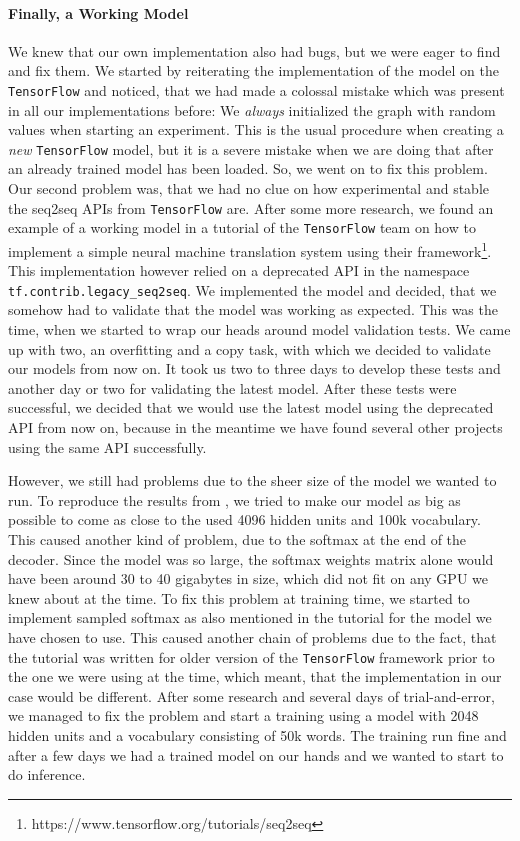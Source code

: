 \paragraph{Finally, a Working Model} We knew that our own implementation also had bugs, but we were eager to find and fix them. We started by reiterating the implementation of the model on the \texttt{TensorFlow} and noticed, that we had made a colossal mistake which was present in all our implementations before: We \emph{always} initialized the graph with random values when starting an experiment. This is the usual procedure when creating a \emph{new} \texttt{TensorFlow} model, but it is a severe mistake when we are doing that after an already trained model has been loaded. So, we went on to fix this problem. Our second problem was, that we had no clue on how experimental and stable the seq2seq APIs from \texttt{TensorFlow} are. After some more research, we found an example of a working model in a tutorial of the \texttt{TensorFlow} team on how to implement a simple neural machine translation system using their framework\footnote{https://www.tensorflow.org/tutorials/seq2seq}. This implementation however relied on a deprecated API in the namespace \texttt{tf.contrib.legacy\_seq2seq}. We implemented the model and decided, that we somehow had to validate that the model was working as expected. This was the time, when we started to wrap our heads around model validation tests. We came up with two, an overfitting and a copy task, with which we decided to validate our models from now on. It took us two to three days to develop these tests and another day or two for validating the latest model. After these tests were successful, we decided that we would use the latest model using the deprecated API from now on, because in the meantime we have found several other projects using the same API successfully.

However, we still had problems due to the sheer size of the model we wanted to run. To reproduce the results from \cite{Vinyals:2015}, we tried to make our model as big as possible to come as close to the used 4096 hidden units and 100k vocabulary. This caused another kind of problem, due to the softmax at the end of the decoder. Since the model was so large, the softmax weights matrix alone would have been around 30 to 40 gigabytes in size, which did not fit on any GPU we knew about at the time. To fix this problem at training time, we started to implement sampled softmax as also mentioned in the tutorial for the model we have chosen to use. This caused another chain of problems due to the fact, that the tutorial was written for older version of the \texttt{TensorFlow} framework prior to the one we were using at the time, which meant, that the implementation in our case would be different. After some research and several days of trial-and-error, we managed to fix the problem and start a training using a model with 2048 hidden units and a vocabulary consisting of 50k words. The training run fine and after a few days we had a trained model on our hands and we wanted to start to do inference.

